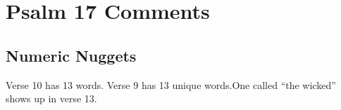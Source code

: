 \section{Psalm 17 Comments}

\subsection{Numeric Nuggets}
Verse 10 has 13 words. Verse 9 has 13 unique words.One called ``the wicked'' shows up in verse 13.
